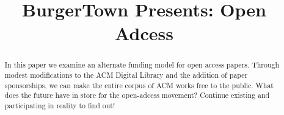 \documentclass[sigtbd,draft]{sigtbd17-style}
\begin{document}
\title{BurgerTown Presents: Open Adcess}
\maketitle

\begin{abstract}
  In this paper we examine an alternate funding model for open access papers.
  Through modest modifications to the ACM Digital Library and the addition of
  paper sponsorships, we can make the entire corpus of ACM works free to the
  public. What does the future have in store for the open-adcess movement?
  Continue existing and participating in reality to find out!
\end{abstract}













{}

\end{document}
